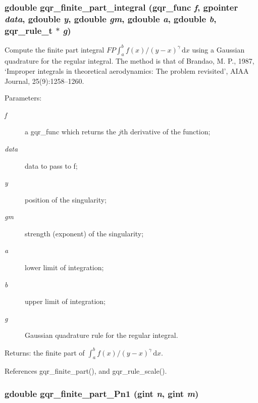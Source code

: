\subsubsection{\setlength{\rightskip}{0pt plus 5cm}gdouble gqr\_\-finite\_\-part\_\-integral (gqr\_\-func {\em f}, \/  gpointer {\em data}, \/  gdouble {\em y}, \/  gdouble {\em gm}, \/  gdouble {\em a}, \/  gdouble {\em b}, \/  {\bf gqr\_\-rule\_\-t} $\ast$ {\em g})}\label{fpart_8c_e1a0bb5eaf86443d1881606dca14b892}


Compute the finite part integral $FP\int_{a}^{b}f(x)/(y-x)^{\gamma}\,\mathrm{d}x$ using a Gaussian quadrature for the regular integral. The method is that of Brandao, M. P., 1987, `Improper integrals in theoretical aerodynamics: The problem revisited', AIAA Journal, 25(9):1258--1260.

\begin{Desc}
\item[Parameters:]
\begin{description}
\item[{\em f}]a gqr\_\-func which returns the $j$th derivative of the function; \item[{\em data}]data to pass to f; \item[{\em y}]position of the singularity; \item[{\em gm}]strength (exponent) of the singularity; \item[{\em a}]lower limit of integration; \item[{\em b}]upper limit of integration; \item[{\em g}]Gaussian quadrature rule for the regular integral.\end{description}
\end{Desc}
\begin{Desc}
\item[Returns:]the finite part of $\int_{a}^{b}f(x)/(y-x)^{\gamma}\,\mathrm{d}x$. \end{Desc}


References gqr\_\-finite\_\-part(), and gqr\_\-rule\_\-scale().
\subsubsection{\setlength{\rightskip}{0pt plus 5cm}gdouble gqr\_\-finite\_\-part\_\-Pn1 (gint {\em n}, \/  gint {\em m})}\label{fpart_8c_c419ae4d5e3e92696ef9d93ab2b409a4}


